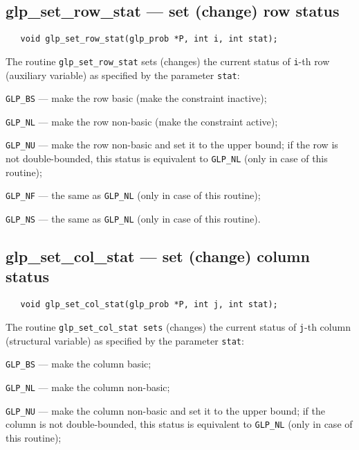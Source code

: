 \subsection{glp\_set\_row\_stat --- set (change) row status}

\synopsis

\begin{verbatim}
   void glp_set_row_stat(glp_prob *P, int i, int stat);
\end{verbatim}

\description

The routine \verb|glp_set_row_stat| sets (changes) the current status
of \verb|i|-th row (auxiliary variable) as specified by the parameter
\verb|stat|:

\verb|GLP_BS| --- make the row basic (make the constraint inactive);

\verb|GLP_NL| --- make the row non-basic (make the constraint active);

\verb|GLP_NU| --- make the row non-basic and set it to the upper bound;
if the row is not double-bounded, this status is equivalent to
\verb|GLP_NL| (only in case of this routine);

\verb|GLP_NF| --- the same as \verb|GLP_NL| (only in case of this
routine);

\verb|GLP_NS| --- the same as \verb|GLP_NL| (only in case of this
routine).

\newpage

\subsection{glp\_set\_col\_stat --- set (change) column status}

\synopsis

\begin{verbatim}
   void glp_set_col_stat(glp_prob *P, int j, int stat);
\end{verbatim}

\description

The routine \verb|glp_set_col_stat sets| (changes) the current status
of \verb|j|-th column (structural variable) as specified by the
parameter \verb|stat|:

\verb|GLP_BS| --- make the column basic;

\verb|GLP_NL| --- make the column non-basic;

\verb|GLP_NU| --- make the column non-basic and set it to the upper
bound; if the column is not double-bounded, this status is equivalent
to \verb|GLP_NL| (only in case of this routine);


